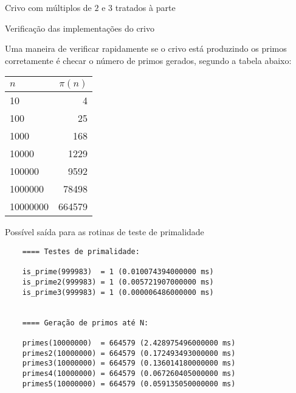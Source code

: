 \begin{frame}[fragile]{Crivo com múltiplos de $2$ e $3$ tratados à parte}
\end{frame}

\begin{frame}[fragile]{Verificação das implementações do crivo}

Uma maneira de verificar rapidamente se o crivo está produzindo os primos corretamente é checar o
número de primos gerados, segundo a tabela abaixo:

\begin{table}[!h]
    \centering
    \begin{tabular}{lr}
        \toprule
        $n$ & $\pi(n)$\\
        \midrule
        10 & 4 \\
        100 & 25 \\
        1000 & 168 \\
        10000 & 1229 \\
        100000 & 9592 \\
        1000000 & 78498 \\
        10000000 & 664579 \\
        \bottomrule
    \end{tabular}
\end{table}

\end{frame}

\begin{frame}[fragile]{Possível saída para as rotinas de teste de primalidade}
    \begin{footnotesize}
    \begin{verbatim}
    ==== Testes de primalidade:

    is_prime(999983)  = 1 (0.010074394000000 ms)
    is_prime2(999983) = 1 (0.005721907000000 ms)
    is_prime3(999983) = 1 (0.000006486000000 ms)


    ==== Geração de primos até N:

    primes(10000000)  = 664579 (2.428975496000000 ms)
    primes2(10000000) = 664579 (0.172493493000000 ms)
    primes3(10000000) = 664579 (0.136014180000000 ms)
    primes4(10000000) = 664579 (0.067260405000000 ms)
    primes5(10000000) = 664579 (0.059135050000000 ms)
    \end{verbatim}
    \end{footnotesize}
\end{frame}
